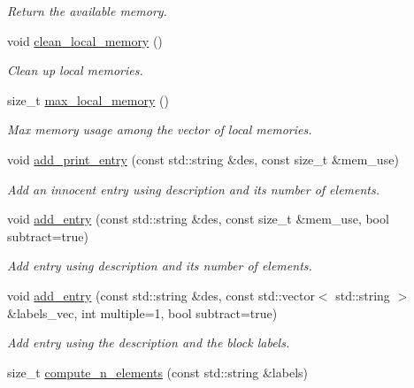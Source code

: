 \begin{DoxyCompactItemize}
\begin{DoxyCompactList}\small\item\em Return the available memory. \end{DoxyCompactList}\item 
void \mbox{\hyperlink{classforte_1_1_d_s_r_g___m_e_m_afe7b7579d767ee201146458caefcd944}{clean\+\_\+local\+\_\+memory}} ()
\begin{DoxyCompactList}\small\item\em Clean up local memories. \end{DoxyCompactList}\item 
size\+\_\+t \mbox{\hyperlink{classforte_1_1_d_s_r_g___m_e_m_a1dd2f817f76bda4a890bf15c60664dcf}{max\+\_\+local\+\_\+memory}} ()
\begin{DoxyCompactList}\small\item\em Max memory usage among the vector of local memories. \end{DoxyCompactList}\item 
void \mbox{\hyperlink{classforte_1_1_d_s_r_g___m_e_m_a6b2ef9118482dc897088d28d29cffe2a}{add\+\_\+print\+\_\+entry}} (const std\+::string \&des, const size\+\_\+t \&mem\+\_\+use)
\begin{DoxyCompactList}\small\item\em Add an innocent entry using description and its number of elements. \end{DoxyCompactList}\item 
void \mbox{\hyperlink{classforte_1_1_d_s_r_g___m_e_m_ad985484ea1139ca02fe50024656a9a11}{add\+\_\+entry}} (const std\+::string \&des, const size\+\_\+t \&mem\+\_\+use, bool subtract=true)
\begin{DoxyCompactList}\small\item\em Add entry using description and its number of elements. \end{DoxyCompactList}\item 
void \mbox{\hyperlink{classforte_1_1_d_s_r_g___m_e_m_aa970ba2e3f8577ad44aa32f8d84fe80e}{add\+\_\+entry}} (const std\+::string \&des, const std\+::vector$<$ std\+::string $>$ \&labels\+\_\+vec, int multiple=1, bool subtract=true)
\begin{DoxyCompactList}\small\item\em Add entry using the description and the block labels. \end{DoxyCompactList}\item 
size\+\_\+t \mbox{\hyperlink{classforte_1_1_d_s_r_g___m_e_m_ad7377189079c97664a573643259743e3}{compute\+\_\+n\+\_\+elements}} (const std\+::string \&labels)

\end{DoxyCompactItemize}
